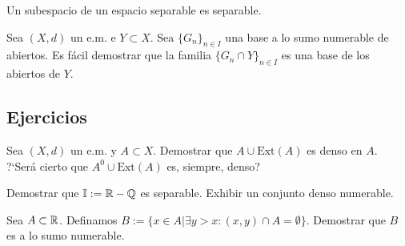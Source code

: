 \begin{corolario}{} Un subespacio de un espacio separable es
separable.
\end{corolario}
\begin{demo} Sea $(X,d)$ un e.m. e $Y\subset X$. Sea $\{G_n\}_{n\in I}$
una base a lo sumo numerable de abiertos. Es fácil demostrar que
la familia $\{G_n\cap Y\}_{n\in I}$ es una base de los abiertos de
$Y$.
\end{demo}

\subsection{Ejercicios}

\begin{ejercicio}{} Sea $(X,d)$ un e.m. y $A\subset X$. Demostrar
que $A\cup \text{Ext}(A)$ es denso en $A$. ?`Será cierto que
$A^0\cup \text{Ext}(A)$ es, siempre, denso?
\end{ejercicio}

\begin{ejercicio}{} Demostrar que $\mathbb{I}:=\mathbb{R}-\mathbb{Q}$ es
separable. Exhibir un conjunto denso numerable.
\end{ejercicio}

\begin{ejercicio}{} Sea $A\subset \mathbb{R}$. Definamos $B:=\{x\in
A|\exists y>x: (x,y)\cap A=\emptyset\}$. Demostrar que $B$ es a lo
sumo numerable.
\end{ejercicio}

